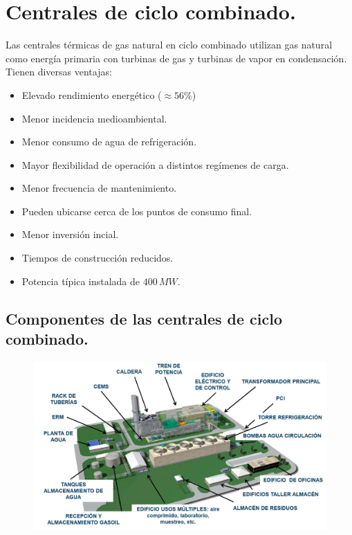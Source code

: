 \chapter{Centrales de ciclo combinado.}

	Las centrales térmicas de gas natural en ciclo combinado utilizan
	gas natural como energía primaria con turbinas de gas y turbinas de
	vapor en condensación. Tienen diversas ventajas:
	
	\begin{itemize}
		\item Elevado rendimiento energético ($\approx 56\%$)
		\item Menor incidencia medioambiental.
		\item Menor consumo de agua de refrigeración.
		\item Mayor flexibilidad de operación a distintos regímenes de carga.
		\item Menor frecuencia de mantenimiento.
		\item Pueden ubicarse cerca de los puntos de consumo final.
		\item Menor inversión incial.
		\item Tiempos de construcción reducidos.
		\item Potencia típica instalada de $400\,MW$.
	\end{itemize}
	
	\section{Componentes de las centrales de ciclo combinado.}
		\begin{figure}[H]
			\centering
			\includegraphics[width=1\linewidth]{res/tema11/partes}
			\label{fig:partes}
		\end{figure}
		
